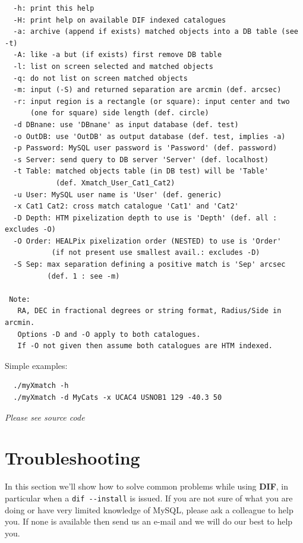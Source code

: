 \documentclass[10pt,titlepage]{article}
\newcommand{\dif}{\textbf{\small DIF}}
\begin{document}
\begin{verbatim}
  -h: print this help
  -H: print help on available DIF indexed catalogues
  -a: archive (append if exists) matched objects into a DB table (see -t)
  -A: like -a but (if exists) first remove DB table
  -l: list on screen selected and matched objects
  -q: do not list on screen matched objects
  -m: input (-S) and returned separation are arcmin (def. arcsec)
  -r: input region is a rectangle (or square): input center and two
      (one for square) side length (def. circle)
  -d DBnane: use 'DBnane' as input database (def. test)
  -o OutDB: use 'OutDB' as output database (def. test, implies -a)
  -p Password: MySQL user password is 'Password' (def. password)
  -s Server: send query to DB server 'Server' (def. localhost)
  -t Table: matched objects table (in DB test) will be 'Table'
            (def. Xmatch_User_Cat1_Cat2)
  -u User: MySQL user name is 'User' (def. generic)
  -x Cat1 Cat2: cross match catalogue 'Cat1' and 'Cat2'
  -D Depth: HTM pixelization depth to use is 'Depth' (def. all : excludes -O)
  -O Order: HEALPix pixelization order (NESTED) to use is 'Order'
           (if not present use smallest avail.: excludes -D)
  -S Sep: max separation defining a positive match is 'Sep' arcsec
          (def. 1 : see -m)

 Note:
   RA, DEC in fractional degrees or string format, Radius/Side in arcmin.
   Options -D and -O apply to both catalogues.
   If -O not given then assume both catalogues are HTM indexed.

\end{verbatim}
%

\noindent Simple examples:
\begin{verbatim}
  ./myXmatch -h
  ./myXmatch -d MyCats -x UCAC4 USNOB1 129 -40.3 50
\end{verbatim}
%
\emph{Please see source code}

%
\newpage
\section{Troubleshooting}
\label{sec:troubles}
In this section we'll show how to solve common problems while using \dif,
in particular when a \verb|dif --install| is issued.
If you are not sure of what you are doing or have very limited knowledge
of MySQL, please ask a colleague to help you. If none is available then
send us an e-mail and we will do our best to help you.
\end{document}
